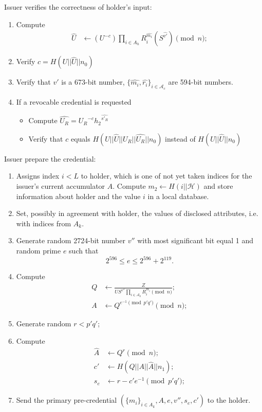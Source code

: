 Issuer verifies the correctness of holder's input:
\begin{enumerate}
\item Compute
\begin{align}
\widehat{U}& \leftarrow (U^{-c}) \prod_{i \in A_h}{R_i^{\widehat{m_i}}}(S^{\widehat{v'}})\pmod{n};
\end{align}
\item Verify 
$c= H(U||\widehat{U}||
n_0)$
\item Verify that $\widehat{v'}$ is a 673-bit number, $\{\widehat{m_i}, \widehat{r_i}\}_{i \in \mathcal{A}_c}$ are 594-bit numbers.
\item If a revocable credential is requested
\begin{itemize}
\item Compute $\widehat{U_R} = {U_R}^{-c}{h_2}^{\widehat{s'_R}}$
\item Verify that $c$ equals $H(U||\widehat{U}||U_R||\widehat{U_R}||n_0)$ instead of $H(U||\widehat{U}||n_0)$
\end{itemize}
\end{enumerate}
Issuer prepare the credential:
\begin{enumerate}
\item Assigns index $i<L$ to holder, which is one of not yet taken indices for the issuer's current accumulator $A$. Compute $m_2\leftarrow H(i||\mathcal{H})$ and store information about holder and the value $i$ in a local database.
\item Set, possibly in agreement with holder, the values of disclosed attributes, i.e. with indices from $A_k$.
\item Generate random 2724-bit number $v''$ with most significant bit equal 1 and random prime  $e$ such that
\begin{equation}\label{eq:e}
2^{596}\leq e \leq 2^{596}+ 2^{119}.
\end{equation}
\item Compute
\begin{align}
Q& \leftarrow \frac{Z}{U S^{v''} \prod_{i\in \mathcal{A}_k}{R_i^{m_i}}\pmod{n}};\\
A& \leftarrow Q^{e^{-1}\pmod{p'q'}}\pmod{n};
\end{align}
\item Generate random $r < p'q'$;
\item Compute
\begin{align}
\widehat{A}&\leftarrow Q^r\pmod{n};\\
c'&\leftarrow H(Q||A||\widehat{A}||n_1);\\
s_e&\leftarrow r - c'e^{-1}\pmod{p'q'};
\end{align}
\item Send the primary pre-credential  $(\{m_i\}_{i\in A_k},A,e,v'',s_e,c')$ to the holder.
\end{enumerate}

